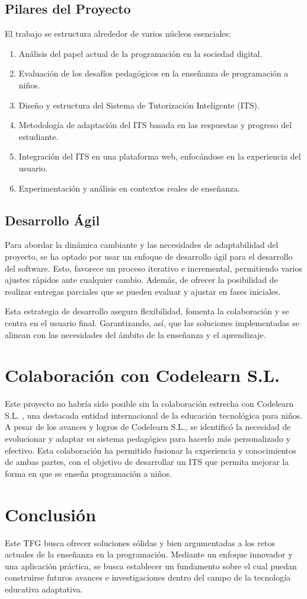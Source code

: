 \subsection{Pilares del Proyecto}
El trabajo se estructura alrededor de varios núcleos esenciales:

\begin{enumerate}
\item Análisis del papel actual de la programación en la sociedad digital.
\item Evaluación de los desafíos pedagógicos en la enseñanza de programación a niños.
\item Diseño y estructura del Sistema de Tutorización Inteligente (ITS).
\item Metodología de adaptación del ITS basada en las respuestas y progreso del estudiante.
\item Integración del ITS en una plataforma web, enfocándose en la experiencia del usuario.
\item Experimentación y análisis en contextos reales de enseñanza.
\end{enumerate}

\subsection{Desarrollo Ágil}
Para abordar la dinámica cambiante y las necesidades de adaptabilidad del proyecto, se ha optado por usar un enfoque de desarrollo ágil para el desarrollo del software. Esto, favorece un proceso iterativo e incremental, permitiendo varios ajustes rápidos ante cualquier cambio. Además, de ofrecer la posibilidad de realizar entregas parciales que se pueden evaluar y ajustar en fases iniciales.

Esta estrategia de desarrollo asegura flexibilidad, fomenta la colaboración y se centra en el usuario final. Garantizando, así, que las soluciones implementadas se alinean con las necesidades del ámbito de la enseñanza y el aprendizaje.

\section{Colaboración con Codelearn S.L.}
Este proyecto no habría sido posible sin la colaboración estrecha con Codelearn S.L.  \cite{codelearn}, una destacada entidad internacional de la educación tecnológica para niños. A pesar de los avances y logros de Codelearn S.L., se identificó la necesidad de evolucionar y adaptar su sistema pedagógico para hacerlo más personalizado y efectivo. Esta colaboración ha permitido fusionar la experiencia y conocimientos de ambas partes, con el objetivo de desarrollar un ITS que permita mejorar la forma en que se enseña programación a niños.

\section{Conclusión}
Este TFG busca ofrecer soluciones sólidas y bien argumentadas a los retos actuales de la enseñanza en la programación. Mediante un enfoque innovador y una aplicación práctica, se busca establecer un fundamento sobre el cual puedan construirse futuros avances e investigaciones dentro del campo de la tecnología educativa adaptativa.

